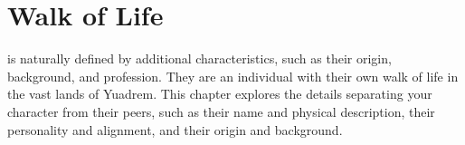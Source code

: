 \chapter{Walk of Life}
\begin{linenumbers}
is naturally defined by additional characteristics, such as their origin, background, and profession.
They are an individual with their own walk of life in the vast lands of Yuadrem.
This chapter explores the details separating your character from their peers, such as their name and physical description, their personality and alignment, and their origin and background.
\end{linenumbers}



